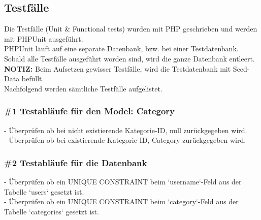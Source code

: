 \subsection{Testfälle}
Die Testfälle (Unit \& Functional tests) wurden mit PHP geschrieben und werden mit PHPUnit ausgeführt.\\
PHPUnit läuft auf eine separate Datenbank, bzw. bei einer Testdatenbank. \\
Sobald alle Testfälle ausgeführt worden sind, wird die ganze Datenbank entleert. \\
\textbf{NOTIZ: } Beim Aufsetzen gewisser Testfälle, wird die Testdatenbank mit Seed-Data befüllt.\\

\noindent
Nachfolgend werden sämtliche Testfälle aufgelistet.\\


\subsubsection*{\#1 Testabläufe für den Model: Category}
- Überprüfen ob bei nicht existierende Kategorie-ID, null zurückgegeben wird.\\
- Überprüfen ob bei existierende Kategorie-ID, Category zurückgegeben wird.

\subsubsection*{\#2 Testabläufe für die Datenbank}
- Überprüfen ob ein UNIQUE CONSTRAINT beim `username`-Feld aus der Tabelle `users` gesetzt ist.\\
- Überprüfen ob ein UNIQUE CONSTRAINT beim `category`-Feld aus der Tabelle `categories` gesetzt ist.

